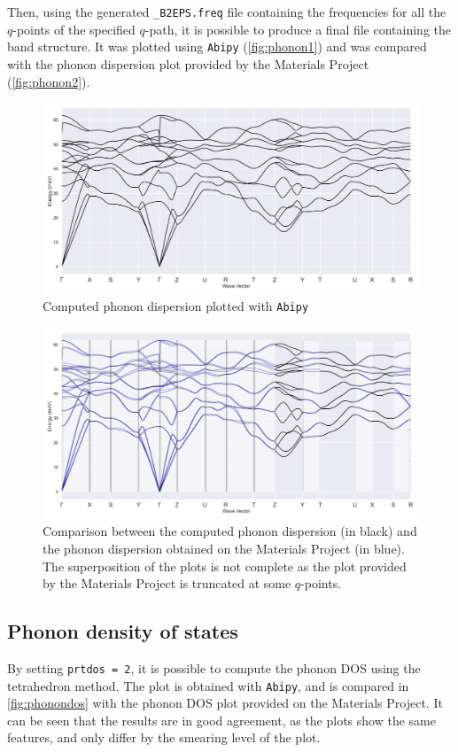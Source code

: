 \documentclass[11pt,a4paper]{article}
\begin{document}
Then, using the generated \texttt{\_B2EPS.freq} file containing the frequencies for all the $q$-points of the specified $q$-path, it is possible to produce a final file containing the band structure. It was plotted using \texttt{Abipy} (\autoref{fig:phonon1}) and was compared with the phonon dispersion plot provided by the Materials Project (\autoref{fig:phonon2}).
\begin{figure}
\centering
\includegraphics[width=\textwidth]{images/phonon1.pdf}
\caption{Computed phonon dispersion plotted with \texttt{Abipy}}
\label{fig:phonon1}
\end{figure}

\begin{figure}
\centering
\includegraphics[width=\textwidth]{images/phonon2.pdf}
\caption{Comparison between the computed phonon dispersion (in black) and the phonon dispersion obtained on the Materials Project (in blue). The superposition of the plots is not complete as the plot provided by the Materials Project is truncated at some $q$-points.}
\label{fig:phonon2}
\end{figure}

\subsection{Phonon density of states}
By setting \texttt{prtdos = 2}, it is possible to compute the phonon DOS using the tetrahedron method. The plot is obtained with \texttt{Abipy}, and is compared in \autoref{fig:phonondos} with the phonon DOS plot provided on the Materials Project. It can be seen that the results are in good agreement, as the plots show the same features, and only differ by the smearing level of the plot.
\end{document}

